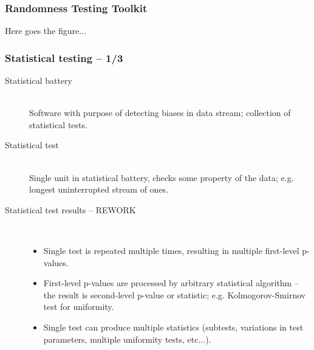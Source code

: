 \documentclass[aspectratio=169]{beamer}
\begin{document}
\begin{frame}
\frametitle{Randomness Testing Toolkit}

\begin{Huge}
Here goes the figure...
\end{Huge}

\end{frame}

\begin{frame}
\frametitle{Statistical testing -- 1/3}

\begin{description}
\item[Statistical battery] \hfill \\ 
Software with purpose of detecting biases in data stream; collection of statistical tests.
\item[Statistical test] \hfill \\
Single unit in statistical battery, checks some property of the data; e.g. longest uninterrupted stream of ones.

\vspace{.3cm}

\item[Statistical test results -- REWORK] \hfill \\
\begin{itemize}
\item Single test is repeated multiple times, resulting in multiple first-level p-values.
\item First-level p-values are processed by arbitrary statistical algorithm -- the result is second-level p-value or statistic; e.g. Kolmogorov-Smirnov test for uniformity.
\item Single test can produce multiple statistics (subtests, variations in test parameters, multiple uniformity tests, etc...).
\end{itemize}
\end{description}

\end{frame}
\end{document}

